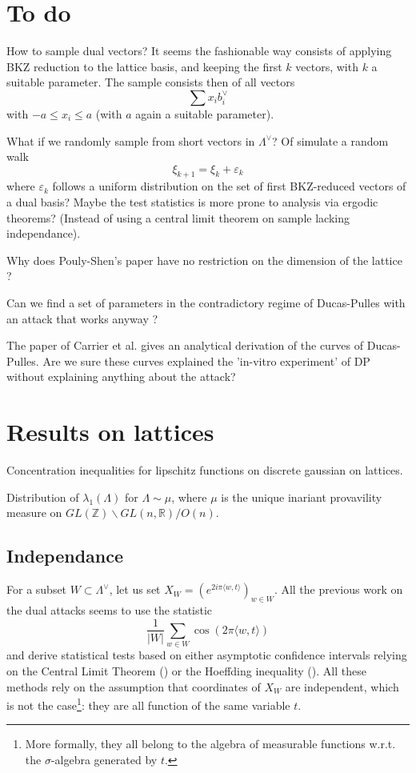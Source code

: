 \section{To do}

How to sample dual vectors? It seems the fashionable way consists of applying BKZ reduction to the lattice basis, and keeping the first $k$ vectors, with $k$ a suitable parameter. The sample consists then of all vectors 
$$\sum x_i b_i^{\vee}$$
with $-a \leq x_i \leq a$ (with $a$ again a suitable parameter).  

What if we randomly sample from short vectors in $\Lambda^\vee$? Of simulate a random walk 
$$\xi_{k+1} = \xi_k +\varepsilon_k$$
where $\varepsilon_k$ follows a uniform distribution on the set of first BKZ-reduced vectors of a dual basis? Maybe the test statistics is more prone to analysis via ergodic theorems? (Instead of using a central limit theorem on sample lacking independance).

Why does Pouly-Shen's paper have no restriction on the dimension of the lattice ?

Can we find a set of parameters in the contradictory regime of Ducas-Pulles with an attack that works anyway ?

The paper of Carrier et al. gives an analytical derivation of the curves of Ducas-Pulles. Are we sure these curves explained the 'in-vitro experiment' of DP without explaining anything about the attack?

\section{Results on lattices}

Concentration inequalities for lipschitz functions on discrete gaussian on lattices.

Distribution of $\lambda_1(\Lambda)$ for $\Lambda \sim \mu$, where $\mu$ is the unique inariant provavility measure on $GL(\mathbb Z ) \backslash GL(n,\mathbb R) / O(n) $.

\subsection{Independance}

For a subset $W\subset \Lambda^\vee$, let us set $X_W = (e^{2 i \pi \langle w , t \rangle})_{w\in W}$. All the previous work on the dual attacks seems to use the statistic
$$\frac{1}{|W|} \sum_{w\in W } \cos( 2\pi \langle w , t\rangle ) $$
and derive statistical tests based on either asymptotic confidence intervals relying on the Central Limit Theorem (\cite{ducas2023does}) or the Hoeffding inequality (\cite{pouly2023provable}). All these methods rely on the assumption that coordinates of $X_W$ are independent, which is not the case\footnote{More formally, they all belong to the algebra of measurable functions w.r.t. the $\sigma$-algebra generated by $t$.}: they are all function of the same variable $t$.

